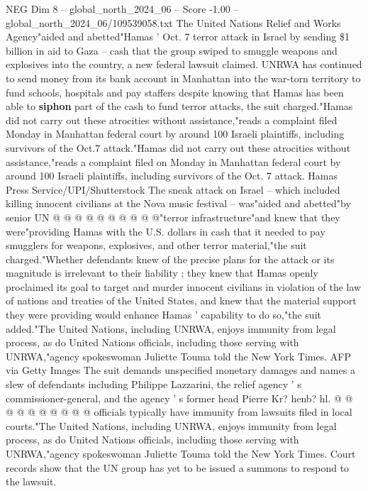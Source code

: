 \begin{textsample}{NEG Dim 8 – global\_north\_2024\_06 – Score -1.00 – global\_north\_2024\_06/109539058.txt}  \label{ex:f8_neg_391}
The United Nations Relief and Works Agency"aided and abetted"Hamas ' Oct. 7 terror attack in Israel by sending \$1 billion in aid to Gaza -- cash that the group swiped to smuggle weapons and explosives into the country, a new federal lawsuit claimed.
UNRWA has continued to send money from its bank account in Manhattan into the war-torn territory to fund schools, hospitals and pay staffers despite knowing that Hamas has been able to \textbf{siphon} part of the cash to fund terror attacks, the suit charged."Hamas did not carry out these atrocities without assistance,"reads a complaint filed Monday in Manhattan federal court by around 100 Israeli plaintiffs, including survivors of the Oct.7 attack."Hamas did not carry out these atrocities without assistance,"reads a complaint filed on Monday in Manhattan federal court by around 100 Israeli plaintiffs, including survivors of the Oct. 7 attack.
Hamas Press Service/UPI/Shutterstock The sneak attack on Israel -- which included killing innocent civilians at the Nova music festival -- was"aided and abetted"by senior UN @ @ @ @ @ @ @ @ @ @"terror infrastructure"and knew that they were"providing Hamas with the U.S. dollars in cash that it needed to pay smugglers for weapons, explosives, and other terror material,"the suit charged."Whether defendants knew of the precise plans for the attack or its magnitude is irrelevant to their liability ; they knew that Hamas openly proclaimed its goal to target and murder innocent civilians in violation of the law of nations and treaties of the United States, and knew that the material support they were providing would enhance Hamas ' capability to do so,"the suit added."The United Nations, including UNRWA, enjoys immunity from legal process, as do United Nations officials, including those serving with UNRWA,"agency spokeswoman Juliette Touma told the New York Times.
AFP via Getty Images The suit demands unspecified monetary damages and names a slew of defendants including Philippe Lazzarini, the relief agency ' s commissioner-general, and the agency ' s former head Pierre Kr? henb? hl. @ @ @ @ @ @ @ @ @ @ officials typically have immunity from lawsuits filed in local courts."The United Nations, including UNRWA, enjoys immunity from legal process, as do United Nations officials, including those serving with UNRWA,"agency spokeswoman Juliette Touma told the New York Times.
Court records show that the UN group has yet to be issued a summons to respond to the lawsuit.

\end{textsample}
